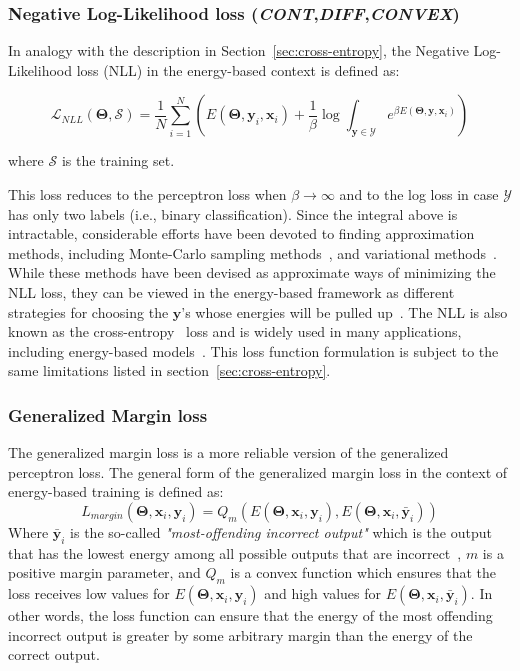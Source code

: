 \documentclass[sn-mathphys-num]{sn-jnl}%
\newcommand \cont{\textit{CONT}}
\newcommand \diff{\textit{DIFF}}
\newcommand \conv{\textit{CONVEX}}
\renewcommand\vec{\mathbf}
\begin{document}
\subsubsection{Negative Log-Likelihood loss (\cont,\diff,\conv)}
In analogy with the description in Section~\ref{sec:cross-entropy}, the Negative Log-Likelihood loss (NLL) in the energy-based context is defined as: 

\begin{equation}
    \label{E_nll}
    \mathcal{L}_{NLL} (\vec{\Theta}, \mathcal{S}) = \frac{1}{N} \sum_{i=1}^N \left(E(\vec{\Theta}, \vec{y}_i, \vec{x}_i) + \frac{1}{\beta} \log \int_{\vec{y}\in\mathcal{Y}} e^{\beta E(\vec{\Theta},\vec{y},\vec{x}_i)}\right)
\end{equation}

where $\mathcal{S}$ is the training set.

This loss reduces to the perceptron loss when $\beta\rightarrow\infty$ and to the log loss in case $\mathcal{Y}$ has only two labels (i.e., binary classification). Since the integral above is intractable, considerable efforts have been devoted to finding approximation methods, including Monte-Carlo sampling methods~\cite{shapiro2003monte}, and variational methods~\cite{jordan1999introduction}. While these methods have been devised as approximate ways of minimizing the NLL loss, they can be viewed in the energy-based framework as different strategies for choosing the $\vec{y}$’s whose energies will be pulled up~\cite{lecun2005loss,lecun2006tutorial}. 
The NLL is also known as the cross-entropy~\cite{levin1988accelerated} loss and is widely used in many applications, including energy-based models~\cite{bengio2000neural,bengio1992global}.
This loss function formulation is subject to the same limitations listed in section~\ref{sec:cross-entropy}.

\subsubsection{Generalized Margin loss}
The generalized margin loss is a more reliable version of the generalized perceptron loss. The general form of the generalized margin loss in the context of energy-based training is defined as:
\begin{equation}
    L_{margin}(\vec{\Theta},\vec{x}_i,\vec{y}_i) = {Q}_m(E(\vec{\Theta},\vec{x}_i,\vec{y}_i), E(\vec{\Theta},\vec{x}_i,\bar{\vec{y}}_i))
\end{equation}
Where $\bar{\vec{y}}_i$ is the so-called \textit{"most-offending incorrect output"} which is
the output that has the lowest energy among all possible outputs that are incorrect~\cite{lecun2006tutorial}, $m$ is a positive margin parameter, and $Q_m$ is a convex function which ensures that the loss receives low values for $E(\vec{\Theta},\vec{x}_i,\vec{y}_i)$ and high values for $E(\vec{\Theta},\vec{x}_i,\bar{\vec{y}}_i)$. In other words, the loss function can ensure that the energy of the most offending incorrect output is greater by some arbitrary margin than the energy of the correct output.
\end{document}
